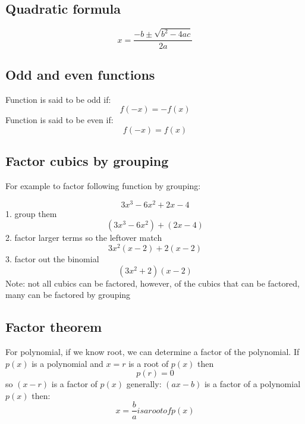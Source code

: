 \documentclass{article}
\begin{document}
\subsection{Quadratic formula}
\begin{equation}
  x = \frac{-b \pm \sqrt{b^2 - 4ac}}{2a}
\end{equation}

\subsection{Odd and even functions}
Function is said to be odd if:
\begin{equation}
  f(-x) = -f(x)
\end{equation}
Function is said to be even if:
\begin{equation}
  f(-x) = f(x)
\end{equation}
\subsection{Factor cubics by grouping}
For example to factor following function by grouping:

\begin{equation}
  3x^3-6x^2+2x-4
\end{equation}
1. group them
\begin{equation}
  (3x^3-6x^2)+(2x-4)
\end{equation}
2. factor larger terms so the leftover match
\begin{equation}
  3x^2(x-2)+2(x-2)
\end{equation}
3. factor out the binomial
\begin{equation}
  (3x^2+2)(x-2)
\end{equation}
Note: not all cubics can be factored, however,
of the cubics that can be factored,
many can be factored by grouping

\subsection{Factor theorem}
For polynomial, if we know root, we can determine a factor of the
polynomial. If $p(x)$ is a polynomial and $x=r$ is a root of $p(x)$ then
\begin{equation}
  p(r) = 0
\end{equation}
so $(x-r)$ is a factor of $p(x)$
generally: $(ax-b)$ is a factor of a polynomial $p(x)$ then:
\begin{equation}
  x = \frac{b}{a} is a root of p(x)
\end{equation}
\end{document}
